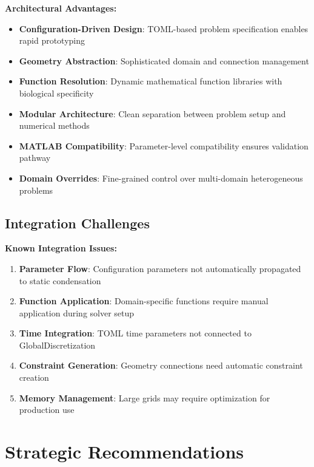\documentclass[11pt,a4paper]{article}
\begin{document}
\begin{structurebox}
\textbf{Architectural Advantages:}

\begin{itemize}[leftmargin=1.5em]
    \item \textbf{Configuration-Driven Design}: TOML-based problem specification enables rapid prototyping
    \item \textbf{Geometry Abstraction}: Sophisticated domain and connection management
    \item \textbf{Function Resolution}: Dynamic mathematical function libraries with biological specificity
    \item \textbf{Modular Architecture}: Clean separation between problem setup and numerical methods
    \item \textbf{MATLAB Compatibility}: Parameter-level compatibility ensures validation pathway
    \item \textbf{Domain Overrides}: Fine-grained control over multi-domain heterogeneous problems
\end{itemize}
\end{structurebox}

\subsection{Integration Challenges}

\begin{warningbox}
\textbf{Known Integration Issues:}

\begin{enumerate}[leftmargin=1.5em]
    \item \textbf{Parameter Flow}: Configuration parameters not automatically propagated to static condensation
    \item \textbf{Function Application}: Domain-specific functions require manual application during solver setup
    \item \textbf{Time Integration}: TOML time parameters not connected to GlobalDiscretization
    \item \textbf{Constraint Generation}: Geometry connections need automatic constraint creation
    \item \textbf{Memory Management}: Large grids may require optimization for production use
\end{enumerate}
\end{warningbox}

\section{Strategic Recommendations}
\end{document}
